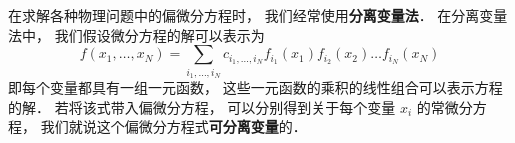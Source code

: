 
在求解各种物理问题中的偏微分方程时， 我们经常使用\textbf{分离变量法}． 在分离变量法中， 我们假设微分方程的解可以表示为
\begin{equation}
f(x_1, \dots , x_N) = \sum_{i_1, \dots, i_N} c_{i_1, \dots, i_N} f_{i_1}(x_1) f_{i_2}(x_2) \dots f_{i_N}(x_N)
\end{equation}
即每个变量都具有一组一元函数， 这些一元函数的乘积的线性组合可以表示方程的解． 若将该式带入偏微分方程， 可以分别得到关于每个变量 $x_i$ 的常微分方程， 我们就说这个偏微分方程式\textbf{可分离变量}的．


